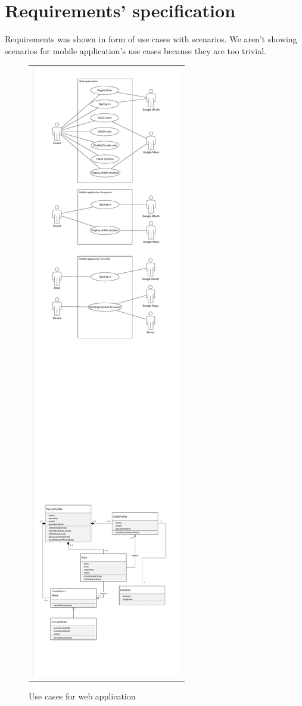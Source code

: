 \documentclass{sprawozdanie-agh}
\begin{document}
	\section{Requirements' specification}
		
		Requirements was shown in form of use cases with scenarios. We aren't showing scenarios for mobile application's use cases because they are too trivial.

		\begin{figure}[H] 
			\centering
			\begin{tabular}{c}
				\includegraphics[width=.80\textwidth]{webUseCase} 
			\end{tabular} 
		\caption{Use cases for web application}
		\end{figure}
\end{document}
